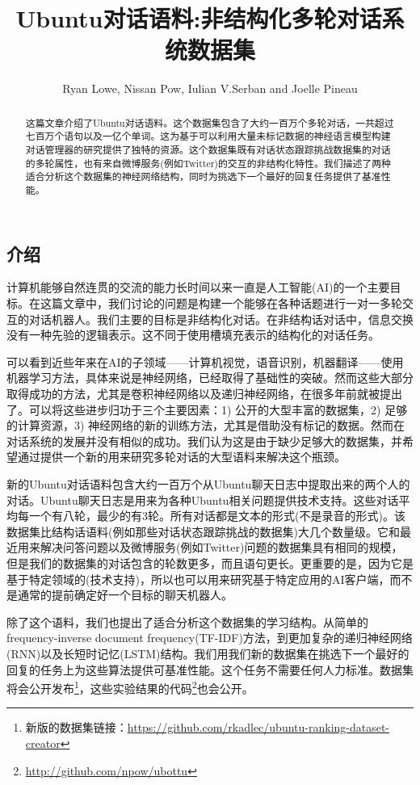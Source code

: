 \documentclass{article}
\title{Ubuntu对话语料:非结构化多轮对话系统数据集}
\author{Ryan Lowe, Nissan Pow, Iulian V.Serban and Joelle Pineau}
\date{}
\begin{document}
	\maketitle
	
	\begin{abstract}
		这篇文章介绍了Ubuntu对话语料。这个数据集包含了大约一百万个多轮对话，一共超过七百万个语句以及一亿个单词。这为基于可以利用大量未标记数据的神经语言模型构建对话管理器的研究提供了独特的资源。这个数据集既有对话状态跟踪挑战数据集的对话的多轮属性，也有来自微博服务(例如Twitter)的交互的非结构化特性。我们描述了两种适合分析这个数据集的神经网络结构，同时为挑选下一个最好的回复任务提供了基准性能。
	\end{abstract}

	\begin{multicols}{2}
	
	\section{介绍}
	计算机能够自然连贯的交流的能力长时间以来一直是人工智能(AI)的一个主要目标。在这篇文章中，我们讨论的问题是构建一个能够在各种话题进行一对一多轮交互的对话机器人。我们主要的目标是非结构化对话。在非结构话对话中，信息交换没有一种先验的逻辑表示。这不同于使用槽填充表示的结构化的对话任务。
	
	可以看到近些年来在AI的子领域——计算机视觉，语音识别，机器翻译——使用机器学习方法，具体来说是神经网络，已经取得了基础性的突破。然而这些大部分取得成功的方法，尤其是卷积神经网络以及递归神经网络，在很多年前就被提出了。可以将这些进步归功于三个主要因素：1) 公开的大型丰富的数据集，2) 足够的计算资源，3) 神经网络的新的训练方法，尤其是借助没有标记的数据。然而在对话系统的发展并没有相似的成功。我们认为这是由于缺少足够大的数据集，并希望通过提供一个新的用来研究多轮对话的大型语料来解决这个瓶颈。
	
	新的Ubuntu对话语料包含大约一百万个从Ubuntu聊天日志中提取出来的两个人的对话。Ubuntu聊天日志是用来为各种Ubuntu相关问题提供技术支持。这些对话平均每一个有八轮，最少的有3轮。所有对话都是文本的形式(不是录音的形式)。该数据集比结构话语料(例如那些对话状态跟踪挑战的数据集)大几个数量级。它和最近用来解决问答问题以及微博服务(例如Twitter)问题的数据集具有相同的规模，但是我们的数据集的对话包含的轮数更多，而且语句更长。更重要的是，因为它是基于特定领域的(技术支持)，所以也可以用来研究基于特定应用的AI客户端，而不是通常的提前确定好一个目标的聊天机器人。
	
	除了这个语料，我们也提出了适合分析这个数据集的学习结构。从简单的 frequency-inverse document frequency(TF-IDF)方法，到更加复杂的递归神经网络(RNN)以及长短时记忆(LSTM)结构。我们用我们新的数据集在挑选下一个最好的回复的任务上为这些算法提供可基准性能。这个任务不需要任何人力标准。数据集将会公开发布\footnote{新版的数据集链接：\href{https://github.com/rkadlec/ubuntu-ranking-dataset-creator}{https://github.com/rkadlec/ubuntu-ranking-dataset-creator}}，这些实验结果的代码\footnote{\href{http://github.com/npow/ubottu}{http://github.com/npow/ubottu}}也会公开。
		

\end{multicols}
\end{document}
